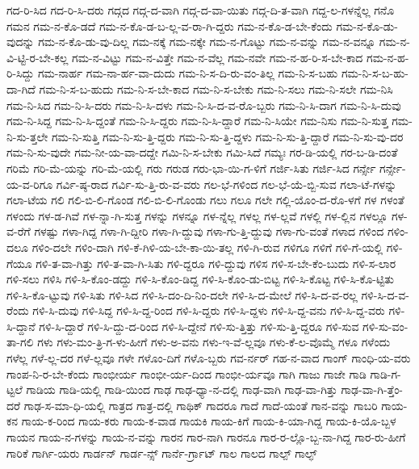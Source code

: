 {ಗದ-ರಿ-ಸಿದ
ಗದ-ರಿ-ಸಿ-ದರು
ಗದ್ಗದ
ಗದ್ಗ-ದ-ವಾಗಿ
ಗದ್ಗ-ದ-ವಾ-ಯಿತು
ಗದ್ಗ-ದಿ-ತ-ವಾಗಿ
ಗದ್ದ-ಲ-ಗಳನ್ನೆಲ್ಲ
ಗನೊ
ಗಮನ
ಗಮ-ನ-ಕೊ-ಡದೆ
ಗಮ-ನ-ಕೊ-ಡ-ಬ-ಲ್ಲ-ವ-ರಾ-ಗಿ-ದ್ದರು
ಗಮ-ನ-ಕೊ-ಡ-ಬೇ-ಕೆಂದು
ಗಮ-ನ-ಕೊ-ಡು-ವುದನ್ನು
ಗಮ-ನ-ಕೊ-ಡು-ವು-ದಿಲ್ಲ
ಗಮ-ನಕ್ಕೆ
ಗಮ-ನಕ್ಕೇ
ಗಮ-ನ-ಗೊಟ್ಟು
ಗಮ-ನ-ವನ್ನು
ಗಮ-ನ-ವನ್ನೂ
ಗಮ-ನ-ವಿ-ಟ್ಟಿ-ರ-ಬೇ-ಕಲ್ಲ
ಗಮ-ನ-ವಿಟ್ಟು
ಗಮ-ನ-ವಿತ್ತೇ
ಗಮ-ನ-ವೆಲ್ಲ
ಗಮ-ನವೇ
ಗಮ-ನ-ಹ-ರಿ-ಸ-ಬೇ-ಕಾದ
ಗಮ-ನ-ಹ-ರಿ-ಸಿದ್ದು
ಗಮ-ನಾರ್ಹ
ಗಮ-ನಾ-ರ್ಹ-ವಾ-ದುದು
ಗಮ-ನಿ-ಸ-ದಿ-ರು-ವಂ-ತಿಲ್ಲ
ಗಮ-ನಿ-ಸ-ಬಹು
ಗಮ-ನಿ-ಸ-ಬ-ಹು-ದಾ-ಗಿದೆ
ಗಮ-ನಿ-ಸ-ಬ-ಹುದು
ಗಮ-ನಿ-ಸ-ಬೇ-ಕಾದ
ಗಮ-ನಿ-ಸ-ಬೇಕು
ಗಮ-ನಿ-ಸಲು
ಗಮ-ನಿ-ಸಲೇ
ಗಮ-ನಿಸಿ
ಗಮ-ನಿ-ಸಿದ
ಗಮ-ನಿ-ಸಿ-ದರು
ಗಮ-ನಿ-ಸಿ-ದಳು
ಗಮ-ನಿ-ಸಿ-ದ-ವ-ರೊ-ಬ್ಬರು
ಗಮ-ನಿ-ಸಿ-ದಾಗ
ಗಮ-ನಿ-ಸಿ-ದುವು
ಗಮ-ನಿ-ಸಿದ್ದ
ಗಮ-ನಿ-ಸಿ-ದ್ದಂತೆ
ಗಮ-ನಿ-ಸಿ-ದ್ದರು
ಗಮ-ನಿ-ಸಿ-ದ್ದಾರೆ
ಗಮ-ನಿ-ಸಿಯೇ
ಗಮ-ನಿಸು
ಗಮ-ನಿ-ಸುತ್ತ
ಗಮ-ನಿ-ಸು-ತ್ತಲೇ
ಗಮ-ನಿ-ಸುತ್ತಿ
ಗಮ-ನಿ-ಸು-ತ್ತಿ-ದ್ದರು
ಗಮ-ನಿ-ಸು-ತ್ತಿ-ದ್ದಳು
ಗಮ-ನಿ-ಸು-ತ್ತಿ-ದ್ದಾರೆ
ಗಮ-ನಿ-ಸು-ವು-ದರ
ಗಮ-ನಿ-ಸು-ವುದೇ
ಗಮ-ನೀ-ಯ-ವಾ-ದದ್ದೇ
ಗಮಿ-ನಿ-ಸ-ಬೇಕು
ಗಮಿ-ಸಿದೆ
ಗಮ್ಯಃ
ಗರ-ಡಿ-ಯಲ್ಲಿ
ಗರ-ಬ-ಡಿ-ದಂತೆ
ಗರಿಮೆ
ಗರಿ-ಮೆ-ಯನ್ನು
ಗರಿ-ಮೆ-ಯಲ್ಲಿ
ಗರು
ಗರುಡ
ಗರು-ಭಾ-ಯಿ-ಗ-ಳಿಗೆ
ಗರ್ಜಿ-ಸಿತು
ಗರ್ಜಿ-ಸಿದ
ಗರ್ನ್ಸೇ
ಗರ್ನ್ಸೇ-ಯ-ವ-ರಿಗೂ
ಗರ್ವಿ-ಷ್ಠ-ರಾದ
ಗರ್ವಿ-ಸು-ತ್ತಿ-ರು-ವ-ವರು
ಗಲ-ಭೆ-ಗಳಿಂದ
ಗಲ-ಭೆ-ಯೆ-ಬ್ಬಿ-ಸುವ
ಗಲಾ-ಟೆ-ಗಳನ್ನು
ಗಲಾ-ಟೆಯ
ಗಲಿ
ಗಲಿ-ಬಿ-ಲಿ-ಗೊಂಡ
ಗಲಿ-ಬಿ-ಲಿ-ಗೊಂಡು
ಗಲು
ಗಲೂ
ಗಲೇ
ಗಲ್ಲಿ-ಯೊಂ-ದ-ರೊ-ಳಗೆ
ಗಳ
ಗಳಂತೆ
ಗಳಂದು
ಗಳ-ಡ-ಗಿವೆ
ಗಳ-ನ್ನಾ-ಗಿ-ಸುತ್ತ
ಗಳನ್ನು
ಗಳನ್ನೂ
ಗಳ-ನ್ನೆಲ್ಲ
ಗಳಲ್ಲ
ಗಳ-ಲ್ಲವೆ
ಗಳಲ್ಲಿ
ಗಳ-ಲ್ಲಿನ
ಗಳಲ್ಲೂ
ಗಳ-ವ-ರೆಗೆ
ಗಳಷ್ಟು
ಗಳಾ-ಗಿದ್ದ
ಗಳಾ-ಗಿ-ದ್ದೀರಿ
ಗಳಾ-ಗಿ-ದ್ದುವು
ಗಳಾ-ಗು-ತ್ತಿ-ದ್ದುವು
ಗಳಾ-ಗು-ವಂತೆ
ಗಳಾದ
ಗಳಿಂದ
ಗಳಿಂ-ದಲೂ
ಗಳಿಂ-ದಲೇ
ಗಳಿಂ-ದಾಗಿ
ಗಳಿ-ಕೆ-ಗಿಳಿ-ಯ-ಬೇ-ಕಾ-ಯಿ-ತಲ್ಲ
ಗಳಿ-ಗಿ-ರುವ
ಗಳಿಗೂ
ಗಳಿಗೆ
ಗಳಿ-ಗೆ-ಯಲ್ಲಿ
ಗಳಿ-ಗೆಯೂ
ಗಳಿ-ತ-ವಾ-ಗಿತ್ತು
ಗಳಿ-ತ-ವಾ-ಗಿ-ಸಿತು
ಗಳಿ-ದ್ದರೂ
ಗಳಿ-ದ್ದುವು
ಗಳಿಸ
ಗಳಿ-ಸ-ಬೇ-ಕೆಂ-ಬುದು
ಗಳಿ-ಸ-ಲಾರ
ಗಳಿ-ಸಲು
ಗಳಿಸಿ
ಗಳಿ-ಸಿ-ಕೊಂ-ಡದ್ದು
ಗಳಿ-ಸಿ-ಕೊಂ-ಡಿದ್ದ
ಗಳಿ-ಸಿ-ಕೊಂ-ಡು-ಬಿಟ್ಟ
ಗಳಿ-ಸಿ-ಕೊಟ್ಟ
ಗಳಿ-ಸಿ-ಕೊ-ಟ್ಟಿತು
ಗಳಿ-ಸಿ-ಕೊ-ಟ್ಟುವು
ಗಳಿ-ಸಿತು
ಗಳಿ-ಸಿದ
ಗಳಿ-ಸಿ-ದಂ-ದಿ-ನಿಂ-ದಲೇ
ಗಳಿ-ಸಿ-ದ-ಮೇಲೆ
ಗಳಿ-ಸಿ-ದ-ವ-ರಲ್ಲ
ಗಳಿ-ಸಿ-ದ-ವ-ರೆಂದು
ಗಳಿ-ಸಿ-ದುವು
ಗಳಿ-ಸಿದ್ದ
ಗಳಿ-ಸಿ-ದ್ದ-ರಿಂದ
ಗಳಿ-ಸಿ-ದ್ದರು
ಗಳಿ-ಸಿ-ದ್ದಳು
ಗಳಿ-ಸಿ-ದ್ದ-ವನು
ಗಳಿ-ಸಿ-ದ್ದ-ವರು
ಗಳಿ-ಸಿ-ದ್ದಾನೆ
ಗಳಿ-ಸಿ-ದ್ದಾರೆ
ಗಳಿ-ಸಿ-ದ್ದು-ದ-ರಿಂದ
ಗಳಿ-ಸಿ-ದ್ದೇನೆ
ಗಳಿ-ಸು-ತ್ತಿತ್ತು
ಗಳಿ-ಸು-ತ್ತಿ-ದ್ದರೂ
ಗಳಿ-ಸುವ
ಗಳಿ-ಸು-ವಂ-ತಾ-ಗಲಿ
ಗಳು
ಗಳು-ಮಂ-ತ್ರಿ-ಗ-ಳು-ಹೀಗೆ
ಗಳು-ಅ-ವನು
ಗಳು-ಇ-ವೆ-ಲ್ಲವೂ
ಗಳು-ಕೆ-ಲ-ವೊಮ್ಮೆ
ಗಳೂ
ಗಳೆಂದು
ಗಳೆಲ್ಲ
ಗಳೆ-ಲ್ಲ-ದರ
ಗಳೆ-ಲ್ಲವೂ
ಗಳೇ
ಗಳೊಂ-ದಿಗೆ
ಗಳೊ-ಬ್ಬರು
ಗವ-ರ್ನರ್
ಗಹ-ನ-ವಾದ
ಗಾಂಗ್
ಗಾಂಧಿ-ಯ-ವರು
ಗಾಂಪ-ನಿ-ರ-ಬೇ-ಕೆಂದು
ಗಾಂಭೀರ್ಯ
ಗಾಂಭೀ-ರ್ಯ-ದಿಂದ
ಗಾಂಭೀ-ರ್ಯವೂ
ಗಾಗಿ
ಗಾಜು
ಗಾಜೇ
ಗಾಡಿ
ಗಾಡಿ-ಗ-ಟ್ಟಲೆ
ಗಾಡಿಯ
ಗಾಡಿ-ಯಲ್ಲಿ
ಗಾಡಿ-ಯಿಂದ
ಗಾಢ
ಗಾಢ-ಧ್ಯಾ-ನ-ದಲ್ಲಿ
ಗಾಢ-ವಾಗಿ
ಗಾಢ-ವಾ-ಗಿತ್ತು
ಗಾಢ-ವಾ-ಗಿ-ತ್ತೆಂ-ದರೆ
ಗಾಢ-ಸ-ಮಾ-ಧಿ-ಯಲ್ಲಿ
ಗಾತ್ರದ
ಗಾತ್ರ-ದಲ್ಲಿ
ಗಾಥಿಕ್
ಗಾದರೂ
ಗಾದೆ
ಗಾದೆ-ಯಂತೆ
ಗಾನ-ವನ್ನು
ಗಾಬರಿ
ಗಾಯ-ಕನ
ಗಾಯ-ಕ-ರಿಂದ
ಗಾಯ-ಕರು
ಗಾಯ-ಕ-ವಾಡ
ಗಾಯಕಿ
ಗಾಯ-ಕಿಗೆ
ಗಾಯ-ಕಿ-ಯಾ-ಗಿದ್ದ
ಗಾಯ-ಕಿ-ಯೊ-ಬ್ಬಳ
ಗಾಯನ
ಗಾಯ-ನ-ಗಳನ್ನು
ಗಾಯ-ನ-ವನ್ನು
ಗಾರನ
ಗಾರ-ನಾಗಿ
ಗಾರನೂ
ಗಾರ-ರ-ಲ್ಲೊ-ಬ್ಬ-ನಾ-ಗಿದ್ದ
ಗಾರ-ರು-ಹೀಗೆ
ಗಾರಿಕೆ
ಗಾರ್ಗಿ-ಯರು
ಗಾರ್ಡನ್
ಗಾರ್ಡ-ನ್ಸ್
ಗಾರ್ನೆ-ರ್ಗ್ರಾಟ್
ಗಾಲ
ಗಾಲದ
ಗಾಲ್ಪ್
ಗಾಲ್ಫ್
}
